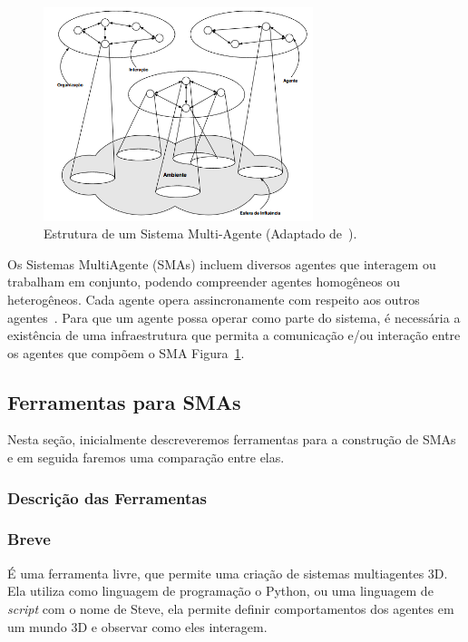 \begin{figure}[htb!]
\centering
\includegraphics[angle=0,width=0.7\textwidth]{imagens//multiAgent.png}
\caption{Estrutura de um Sistema Multi-Agente (Adaptado de~\citep{wooldridge2009introduction:2009}).} \label{fig:MultiAgent}
\end{figure}

Os Sistemas MultiAgente (SMAs) incluem diversos agentes que interagem ou trabalham em
conjunto, podendo compreender agentes homogêneos ou heterogêneos. Cada agente opera
assincronamente com respeito aos outros agentes~\citep{wooldridge2009introduction:2009}. Para que um agente possa operar como parte do sistema, é necessária a existência de uma infraestrutura que permita a
comunicação e/ou interação entre os agentes que compõem o SMA Figura~\ref{fig:MultiAgent}.

\subsection{Ferramentas para SMAs} \label{sec:FerramentaSMA}

Nesta seção, inicialmente descreveremos ferramentas para a construção de SMAs e em seguida faremos uma comparação entre elas.

\subsubsection{Descrição das Ferramentas}

\subsubsection*{Breve}

É uma ferramenta livre, que permite uma criação de sistemas multiagentes 3D. Ela utiliza como linguagem de programação o Python, ou uma linguagem de \textit{script} com o nome de Steve, ela permite definir comportamentos dos agentes em um mundo 3D e observar como eles interagem. 


